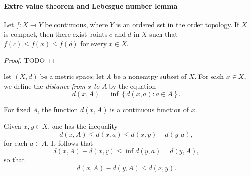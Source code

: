 \paragraph{Extre value theorem and Lebesgue number lemma}

\begin{theorem}
  Let \( f: X \to Y \) be continuous, where \( Y \) is an ordered set in the order topology.
  If \( X \) is compact, then there exist points \( c \) and \( d \) in \( X \) such that \( f(c) \leq f(x) \leq f(d) \) for every \( x \in X \).
\end{theorem}
\begin{proof}
  TODO %
\end{proof}

\begin{definition}
  let \( (X, d) \) be a metric space;
  let \( A \) be a nonemtpy subset of \( X \).
  For each \( x \in X \), we define the \emph{distance from} \( x \) \emph{to} \( A \) by the equation
  \[
    d(x, A) = \inf \left\lbrace d(x, a): a \in A \right\rbrace.
  \]
\end{definition}

\begin{lemma}
  For fixed \( A \), the function \( d(x, A) \) is a continuous function of \( x \).
\end{lemma}
\begin{sketchproof}
  Given \( x, y \in X \), one has the inequality
  \[
    d(x, A) \leq d(x, a) \leq d(x, y) + d(y, a),
  \]
  for each \( a \in A \).
  It follows that
  \[
    d(x, A) - d(x, y) \leq \inf d(y, a) = d(y, A),
  \]
  so that
  \[
    d(x, A) - d(y, A) \leq d(x, y).
  \]
\end{sketchproof}

